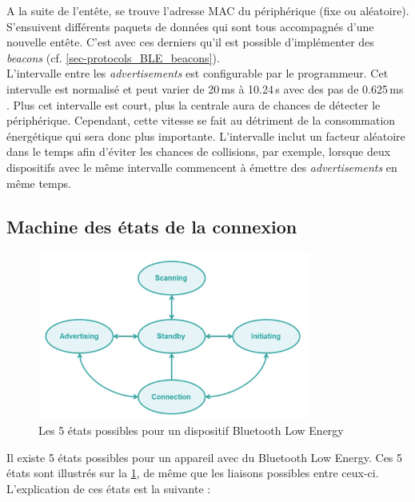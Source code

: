 A la suite de l'entête, se trouve l'adresse MAC du périphérique (fixe ou aléatoire). S'ensuivent différents paquets de données qui sont tous accompagnés d'une nouvelle entête. C'est avec ces derniers qu'il est possible d'implémenter des \textit{beacons} (cf. \cref{sec-protocols_BLE_beacons}).\\

L'intervalle entre les \textit{advertisements} est configurable par le programmeur. Cet intervalle est normalisé et peut varier de 20\,ms à 10.24\,s avec des pas de 0.625\,ms \cite{Lesson3I56:online}. Plus cet intervalle est court, plus la centrale aura de chances de détecter le périphérique. Cependant, cette vitesse se fait au détriment de la consommation énergétique qui sera donc plus importante. L'intervalle inclut un facteur aléatoire dans le temps afin d'éviter les chances de collisions, par exemple, lorsque deux dispositifs avec le même intervalle commencent à émettre des \textit{advertisements} en même temps.

\subsection{Machine des états de la connexion}

\begin{figure}[ht!]
    \centering
    \includegraphics[width=0.8\textwidth]{Figures/Protocols/Bluetooth/state_machine_5_states.PNG}
    \caption{Les 5 états possibles pour un dispositif Bluetooth Low Energy}
    \label{fig-state_machine_5_states}
\end{figure}


Il existe 5 états possibles pour un appareil avec du Bluetooth Low Energy. Ces 5 états sont illustrés sur la \cref{fig-state_machine_5_states}, de même que les liaisons possibles entre ceux-ci. L'explication de ces états est la suivante : 

